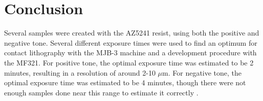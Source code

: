 \newpage
\section*{Conclusion}
Several samples were created with the AZ5241 resist, using both the positive and negative tone. Several different exposure times were used to find an optimum for contact lithography with the MJB-3 machine and a development procedure with the MF321. For positive tone, the optimal exposure time was estimated to be 2 minutes, resulting in a resolution of around 2-10 $\mu$m. For negative tone, the optimal exposure time was estimated to be 4 minutes, though there were not enough samples done near this range to estimate it correctly .